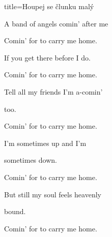 \begin{song}{title=\predtitle\centering Houpej se člunku malý \\\large \vspace*{-0.3cm}}
{\begin{centerjustified}
\begin{varwidth}[t]{0.48\textwidth}
A band of angels comin' after me

Comin' for to carry me home.




\sloka
If you get there before I do.

Comin' for to carry me home.

Tell all my friends I'm a-comin' 

too.

Comin' for to carry me home.




\sloka
I'm sometimes up and I'm 

sometimes down.

Comin' for to carry me home.

But still my soul feels heavenly 

bound.

Comin' for to carry me home.



\end{varwidth}

\end{centerjustified}
}
\setcounter{Slokočet}{0}
\end{song}
